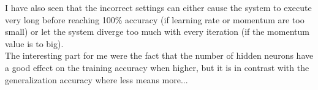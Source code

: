 \documentclass[pdftex,10pt,a4paper]{report}
\begin{document}
I have also seen that the incorrect settings can either cause the system to execute very long before reaching 100\% accuracy (if learning rate or momentum are too small) or let the system diverge too much with every iteration (if the momentum value is to big).\\

The interesting part for me were the fact that the number of hidden neurons have a good effect on the training accuracy when higher, but it is in contrast with the generalization accuracy where less means more... 


\endgroup
	
\end{document}
